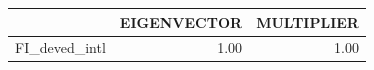 \begin{tabular}{rrr}
  \hline
 & EIGENVECTOR & MULTIPLIER \\ 
  \hline
FI\_deved\_intl & 1.00 & 1.00 \\ 
   \hline
\end{tabular}
